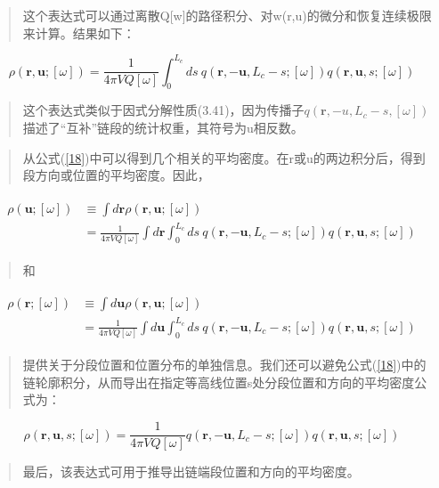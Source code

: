 \begin{quotation}
这个表达式可以通过离散Q[w]的路径积分、对w(r,u)的微分和恢复连续极限来计算。结果如下：
\end{quotation}
\begin{equation}\label{18}
\rho(\mathbf{r},\mathbf{u};[\omega])=\frac{1}{4\pi VQ[\omega]}\int_{0}^{L_c}ds~ q(\mathbf{r},-\mathbf{u},L_c-s;[\omega])q(\mathbf{r},\mathbf{u},s;[\omega])
\end{equation}
\begin{quotation}
这个表达式类似于因式分解性质(3.41)，因为传播子$q(\mathbf{r},-u,L_c-s,[\omega])$描述了“互补”链段的统计权重，其符号为u相反数。
\end{quotation}
\begin{quotation}
从公式(\ref{18})中可以得到几个相关的平均密度。在r或u的两边积分后，得到段方向或位置的平均密度。因此，
\end{quotation}
\begin{align}\label{19}
\begin{split}
\rho(\mathbf{u};[\omega])&\equiv\int d\mathbf{r} \rho(\mathbf{r},\mathbf{u};[\omega]) \\&=\frac{1}{4\pi VQ[\omega]}\int d\mathbf{r} \int_{0}^{L_c}ds~q(\mathbf{r},-\mathbf{u},L_c-s;[\omega])q(\mathbf{r},\mathbf{u},s;[\omega])
\end{split}
\end{align}
\begin{quotation}
和
\end{quotation}
\begin{align}\label{20}
\begin{split}
\rho(\mathbf{r};[\omega])&\equiv\int d\mathbf{u} \rho(\mathbf{r},\mathbf{u};[\omega]) \\&=\frac{1}{4\pi VQ[\omega]}\int d\mathbf{u} \int_{0}^{L_c}ds~q(\mathbf{r},-\mathbf{u},L_c-s;[\omega])q(\mathbf{r},\mathbf{u},s;[\omega])
\end{split}
\end{align}
\begin{quotation}
提供关于分段位置和位置分布的单独信息。我们还可以避免公式(\ref{18})中的链轮廓积分，从而导出在指定等高线位置s处分段位置和方向的平均密度公式为：
\end{quotation}
\begin{equation}\label{21}
\rho(\mathbf{r},\mathbf{u},s;[\omega])=\frac{1}{4\pi VQ[\omega]}q(\mathbf{r},-\mathbf{u},L_c-s;[\omega])q(\mathbf{r},\mathbf{u},s;[\omega])
\end{equation}
\begin{quotation}
最后，该表达式可用于推导出链端段位置和方向的平均密度。
\end{quotation}

